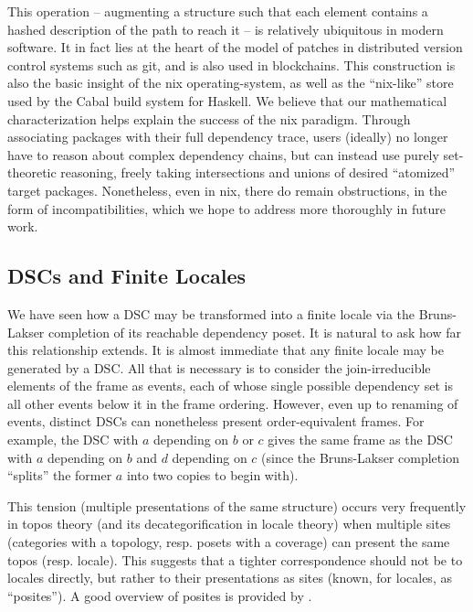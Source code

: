 \documentclass[a4paper,USenglish,cleveref, autoref, thm-restate,authorcolumns]{lipics-v2019}
\begin{document}
This operation – augmenting a structure such that each element contains a hashed description of
the path to reach it – is relatively ubiquitous in modern software.  It in fact lies at the heart
of the model of patches in distributed version control systems such as git, and is also used in
blockchains.  This construction is also the basic insight of the nix operating-system, as well as
the ``nix-like'' store used by the Cabal build system for Haskell.  We believe that our mathematical
characterization helps explain the success of the nix paradigm. Through associating packages with
their full dependency trace, users (ideally) no longer have to reason about complex dependency
chains, but can instead use purely set-theoretic reasoning, freely taking intersections and unions
of desired ``atomized'' target packages. Nonetheless, even in nix, there do remain obstructions, in the form of incompatibilities, which we hope to address more thoroughly in future work.


\subsection{DSCs and Finite Locales}

We have seen how a DSC may be transformed into a finite locale via the Bruns-Lakser completion of its reachable dependency poset. It is natural to ask how far this relationship extends. It is almost immediate that any finite locale may be generated by a DSC. All that is necessary is to consider the join-irreducible elements of the frame as events, each of whose single possible dependency set is all other events below it in the frame ordering. However, even up to renaming of events, distinct DSCs can nonetheless present order-equivalent frames. For example, the DSC with \(a\) depending on \(b\) or \(c\) gives the same frame as the DSC with \(a\) depending on \(b\) and \(d\) depending on \(c\) (since the Bruns-Lakser completion ``splits'' the former \(a\) into two copies to begin with). 

This tension (multiple presentations of the same structure) occurs very frequently in topos theory (and its decategorification in locale theory) when multiple sites (categories with a topology, resp. posets with a coverage) can present the same topos (resp. locale). This suggests that a tighter correspondence should not be to locales directly, but rather to their presentations as sites (known, for locales, as ``posites''). A good overview of posites is provided by \cite{schultz2017temporal}.
\end{document}
